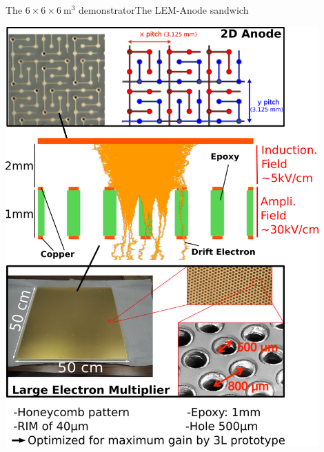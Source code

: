 \documentclass[10pt]{beamer}
\begin{document}
\begin{frame}{The \texorpdfstring{$6 \times 6 \times \SI{6}{\meter\cubed}$}{666}
    		demonstrator}{The LEM-Anode sandwich}
\begin{minipage}{0.48\textwidth}
	   		\end{minipage}\hfill
	   		\begin{minipage}{0.48\textwidth}
	   			\includegraphics[width=0.9\textwidth]{figures/666/lem_anode.png}
	   		\end{minipage}
    \end{frame}
    
\end{document}
